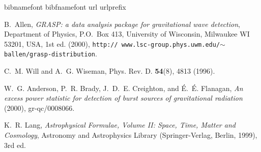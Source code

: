 \newpage
\newpage
\newpage
\newpage
\newpage
\newpage
\newpage
\newpage
\newpage
\newpage
\newpage
\newpage

\newpage\begin{thebibliography}{1}
\expandafter\ifx\csname bibnamefont\endcsname\relax
  \def\bibnamefont#1{#1}\fi
\expandafter\ifx\csname bibfnamefont\endcsname\relax
  \def\bibfnamefont#1{#1}\fi
\expandafter\ifx\csname url\endcsname\relax
  \def\url#1{\texttt{#1}}\fi
\expandafter\ifx\csname urlprefix\endcsname\relax\def\urlprefix{URL }\fi
\providecommand{\bibinfo}[2]{#2}
\providecommand{\eprint}[2][]{\url{#2}}

\bibinfo{author}{\bibfnamefont{B.}~\bibnamefont{Allen}},
  \emph{\bibinfo{title}{GRASP: a data analysis package for gravitational wave
  detection}}, \bibinfo{address}{Department of Physics, P.O.\ Box 413,
  University of Wisconsin, Milwaukee WI 53201, USA}, \bibinfo{edition}{1st} ed.
  (\bibinfo{year}{2000}), \bibinfo{note}{\texttt{http:\slash\slash
  www.lsc-group.phys.uwm.edu\slash$\sim$ballen\slash grasp-distribution}}.

\bibinfo{author}{\bibfnamefont{C.~M.} \bibnamefont{Will}} \bibnamefont{and}
  \bibinfo{author}{\bibfnamefont{A.~G.} \bibnamefont{Wiseman}},
  \bibinfo{journal}{Phys. Rev. D.}
  \textbf{\bibinfo{volume}{54}}(\bibinfo{number}{8}), \bibinfo{pages}{4813}
  (\bibinfo{year}{1996}).

\bibinfo{author}{\bibfnamefont{W.~G.} \bibnamefont{Anderson}},
  \bibinfo{author}{\bibfnamefont{P.~R.} \bibnamefont{Brady}},
  \bibinfo{author}{\bibfnamefont{J.~D.~E.} \bibnamefont{Creighton}},
  \bibnamefont{and} \bibinfo{author}{\bibfnamefont{\'E.~\'E.}
  \bibnamefont{Flanagan}}, \emph{\bibinfo{title}{An excess power statistic for
  detection of burst sources of gravitational radiation}}
  (\bibinfo{year}{2000}), \bibinfo{note}{gr-qc/0008066}.

\bibinfo{author}{\bibfnamefont{K.~R.} \bibnamefont{Lang}},
  \emph{\bibinfo{title}{Astrophysical Formulae, Volume II: Space, Time, Matter
  and Cosmology}}, Astronomy and Astrophysics Library
  (\bibinfo{publisher}{Springer-Verlag}, \bibinfo{address}{Berlin},
  \bibinfo{year}{1999}), \bibinfo{edition}{3rd} ed.


\end{thebibliography}
